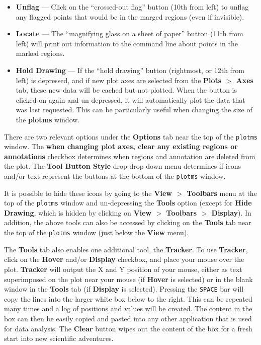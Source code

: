 \begin{itemize}
\item {\bf Unflag} --- Click on the ``crossed-out flag'' button (10th from left) to unflag any flagged points that would be in the marged regions (even if invisible).

\item {\bf Locate} --- The ``magnifying glass on a sheet of paper'' button (11th from left) will print out information to the command line about points in the marked regions.  

\item {\bf Hold Drawing} --- If the ``hold drawing'' button (rightmost, or 12th from left) is depressed, and if new plot axes are selected from the {\bf Plots $>$ Axes} tab, these new data will be cached but not plotted. When the button is clicked on again and un-depressed, it will automatically plot the data that was last requested. This can be particularly useful when changing the size of the {\bf plotms} window.
\end{itemize}

There are two relevant options under the {\bf Options} tab near the top of the {\tt plotms} window. The {\bf when changing plot axes, clear any existing regions or annotations} checkbox determines when regions and annotation are deleted from the plot. The {\bf Tool Button Style} drop-drop down menu determines if icons and/or text represent the buttons at the bottom of the {\tt plotms} window. 

It is possible to hide these icons by going to the {\bf View $>$ Toolbars} menu at the top of the {\tt plotms} window and un-depressing the {\bf Tools} option (except for {\bf Hide Drawing}, which is hidden by clicking on {\bf View $>$ Toolbars $>$ Display}). In addition, the above tools can also be accessed by clicking on the {\bf Tools} tab near the top of the {\tt plotms} window (just below the {\bf View} menu). 

The {\bf Tools} tab also enables one additional tool, the {\bf
  Tracker}. To use {\bf Tracker}, click on the {\bf Hover} and/or {\bf
  Display} checkbox, and place your mouse over the plot. {\bf Tracker}
will output the X and Y position of your mouse, either as text
superimposed on the plot near your mouse (if {\bf Hover} is selected)
or in the blank window in the {\bf Tools} tab (if {\bf Display} is
selected). Pressing the {\tt SPACE} bar will copy the lines into the
larger white box below to the right. This can be repeated many times
and a log of positions and values will be created. The content in the
box can then be easily copied and pasted into any other application
that is used for data analysis. The {\bf Clear} button wipes out the
content of the box for a fresh start into new scientific adventures.




